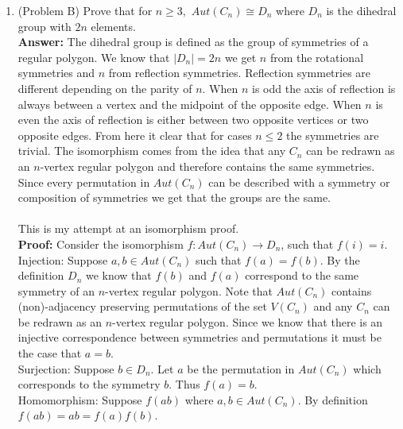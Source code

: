 \documentclass{amsart}
\begin{document}
\begin{enumerate}
\item (Problem B) Prove that for $n\geq 3,$ $Aut(C_n) \cong D_n$ where $D_n$ is the dihedral group with $2n$ elements.  \\


\textbf{Answer:} The dihedral group is defined as the group of symmetries of a regular polygon. We know that $|D_n| = 2n$ we get $n$ from the rotational symmetries and $n$ from reflection symmetries. Reflection symmetries are different depending on the parity of $n$. When $n$ is odd the axis of reflection is always between a vertex and the midpoint of the opposite edge. When $n$ is even the axis of reflection is either between two opposite vertices or two opposite edges. From here it clear that for cases $n\leq 2$ the symmetries are trivial. The isomorphism comes from the idea that any $C_n$ can be redrawn as an $n$-vertex regular polygon and therefore contains the same symmetries. Since every permutation in $Aut(C_n)$ can be described with a symmetry or composition of symmetries we get that the groups are the same.\\\\




This is my attempt at an isomorphism proof.\\
\textbf{Proof:} Consider the isomorphism $f: Aut(C_n) \to D_n$, such that $f(i) = i$.\\

Injection: Suppose $a,b \in Aut(C_n)$ such that $f(a) = f(b)$. By the definition $D_n$ we know that $f(b)$ and $f(a)$ correspond to the same symmetry of an $n$-vertex regular polygon. Note that $Aut(C_n)$ contains (non)-adjacency preserving permutations of the set $V(C_n)$ and any $C_n$ can be redrawn as an $n$-vertex regular polygon. 
Since we know that there is an injective correspondence between symmetries and permutations it must be the case that $a = b$.\\

Surjection: Suppose $b \in D_n$. Let $a$ be the permutation in $Aut(C_n)$ which corresponds to the symmetry $b$. Thus $f(a) = b$.\\

Homomorphism: Suppose $f(ab)$ where $a,b \in Aut(C_n)$. By definition $f(ab) = ab = f(a)f(b)$.\\








\vspace{1.5in}


\end{enumerate}
\end{document}

